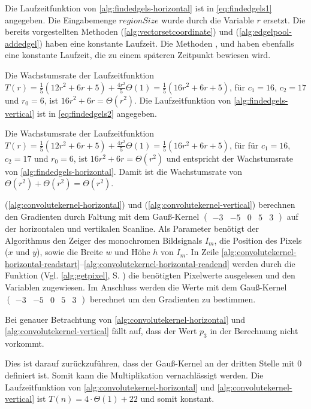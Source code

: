 Die Laufzeitfunktion von \autoref{alg:findedgels-horizontal} ist in \autoref{eq:findedgels1} angegeben. Die Eingabemenge
 $\mathit{regionSize}$ wurde durch die Variable $r$ ersetzt. Die bereits vorgestellten Methoden
  (\autoref{alg:vectorsetcoordinate}) und 
 (\autoref{alg:edgelpool-addedgel}) haben eine konstante Laufzeit. Die Methoden ,
  und  haben ebenfalls eine konstante Laufzeit, die zu einem
 späteren Zeitpunkt bewiesen wird.

Die Wachstumsrate der Laufzeitfunktion $T(r) = \tfrac{1}{5} (12r^2 + 6r + 5) + \frac{4r^2}{5}\Theta(1)
 = \tfrac{1}{5} (16r^2 + 6r + 5)$, für $c_{1} = 16$, $c_{2} = 17$ und $r_{0} = 6$, ist $16r^2 + 6r = \Theta(r^2)$. Die
 Laufzeitfunktion von \autoref{alg:findedgels-vertical} ist in \autoref{eq:findedgels2} angegeben.

Die Wachstumsrate der Laufzeitfunktion $T(r) = \tfrac{1}{5} (12r^2 + 6r + 5) + \frac{4r^2}{5}\Theta(1)
 = \tfrac{1}{5} (16r^2 + 6r + 5)$, für für $c_{1} = 16$, $c_{2} = 17$ und $r_{0} = 6$, ist $16r^2 + 6r = \Theta(r^2)$
 und entspricht der Wachstumsrate von \autoref{alg:findedgels-horizontal}. Damit ist die Wachstumsrate von  $\Theta(r^2) + \Theta(r^2) = \Theta(r^2)$.

 (\autoref{alg:convolutekernel-horizontal}) und 
 (\autoref{alg:convolutekernel-vertical}) berechnen den Gradienten durch Faltung mit dem Gauß-Kernel
$\left( \begin{smallmatrix}
-3& -5& 0& 5& 3
\end{smallmatrix} \right)$
auf der horizontalen und vertikalen Scanline. Als Parameter benötigt der Algorithmus den Zeiger des monochromen
 Bildsignals $I_m$, die Position des Pixels ($x$ und $y$), sowie die Breite $w$ und Höhe $h$ von $I_m$. In Zeile
 \ref{alg:convolutekernel-horizontal-readstart}--\ref{alg:convolutekernel-horizontal-readend} werden durch die
 Funktion  (Vgl. \autoref{alg:getpixel}, S. \pageref{alg:getpixel}) die benötigten Pixelwerte
 ausgelesen und den Variablen zugewiesen. Im Anschluss werden die Werte mit dem Gauß-Kernel
$\left( \begin{smallmatrix}
-3& -5& 0& 5& 3
\end{smallmatrix} \right)$
berechnet um den Gradienten zu bestimmen.

Bei genauer Betrachtung von \autoref{alg:convolutekernel-horizontal} und \autoref{alg:convolutekernel-vertical}
 fällt auf, dass der Wert $p_3$ in der Berechnung nicht vorkommt.

Dies ist darauf zurückzuführen, dass der Gauß-Kernel an der dritten Stelle mit $0$ definiert ist. Somit kann die
 Multiplikation vernachlässigt werden. Die Laufzeitfunktion von \autoref{alg:convolutekernel-horizontal} und
 \autoref{alg:convolutekernel-vertical} ist $T(n) = 4 \cdot \Theta(1) + 22$ und somit konstant.

